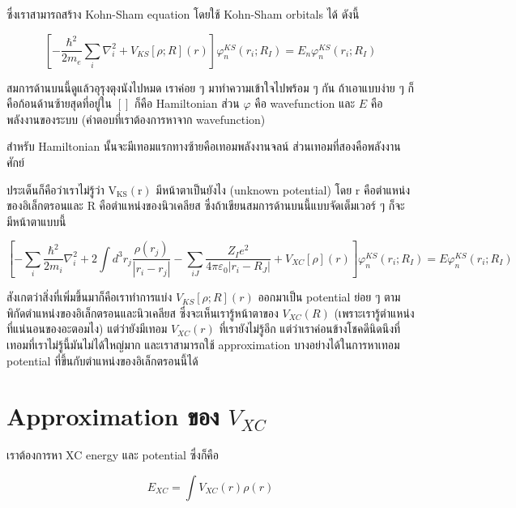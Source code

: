 \noindent ซึ่งเราสามารถสร้าง Kohn-Sham equation โดยใช้ Kohn-Sham orbitals ได้ ดังนี้

\begin{equation}
    \left[-\frac{\hbar^2}{2 m_e} \sum_i \nabla_i^2
        + V_{K S}[\rho ; R](r)\right]
    \varphi_n^{K S}\left(r_i ; R_I\right)
    = E_n \varphi_n^{K S}\left(r_i ; R_I\right)
\end{equation}

\noindent สมการด้านบนนี้ดูแล้วอุรุงตุงนังไปหมด เราค่อย ๆ มาทำความเข้าใจไปพร้อม ๆ กัน ถ้าเอาแบบง่าย ๆ
ก็คือก้อนด้านซ้ายสุดที่อยู่ใน $[ ]$ ก็คือ Hamiltonian ส่วน $\varphi$ คือ wavefunction และ $E$
คือพลังงานของระบบ (คำตอบที่เราต้องการหาจาก wavefunction)

สำหรับ Hamiltonian นั้นจะมีเทอมแรกทางซ้ายคือเทอมพลังงานจลน์ ส่วนเทอมที่สองคือพลังงานศักย์

ประเด็นก็คือว่าเราไม่รู้ว่า $\mathrm{V}_{\mathrm{KS}}(\mathrm{r})$ มีหน้าตาเป็นยังไง (unknown potential)
โดย $\mathrm{r}$ คือตำแหน่งของอิเล็กตรอนและ $\mathrm{R}$ คือตำแหน่งของนิวเคลียส
ซึ่งถ้าเขียนสมการด้านบนนี้แบบจัดเต็มเวอร์ ๆ ก็จะมีหน้าตาแบบนี้

\begin{equation}
    \left[-\sum_i \frac{\hbar^2}{2 m_i} \nabla_i^2+2 \int d^3 r_j
        \frac{\rho\left(r_j\right)}{\left|r_i-r_j\right|}
        -\sum_{i J} \frac{Z_I e^2}{4 \pi \varepsilon_0\left|r_i-R_J\right|}
        + V_{X C}[\rho](r)\right] \varphi_n^{K S}\left(r_i ; R_I\right)
    = E \varphi_n^{K S}\left(r_i ; R_I\right)
\end{equation}

สังเกตว่าสิ่งที่เพิ่มขึ้นมาก็คือเราทำการแบ่ง $V_{K S}[\rho ; R](r)$ ออกมาเป็น potential ย่อย ๆ
ตามพิกัดตำแหน่งของอิเล็กตรอนและนิวเคลียส ซึ่งจะเห็นเรารู้หน้าตาของ $V_{X C}(R)$ (เพราะเรารู้ตำแหน่งที่แน่นอนของอะตอมไง)
แต่ว่ายังมีเทอม $V_{X C}(r)$ ที่เรายังไม่รู้อีก แต่ว่าเราค่อนข้างโชคดีนิดนึงที่เทอมที่เราไม่รู้นี้มันไม่ได้ใหญ่มาก%
และเราสามารถใช้ approximation บางอย่างได้ในการหาเทอม potential ที่ขึ้นกับตำแหน่งของอิเล็กตรอนนี้ได้

\section{Approximation ของ $V_{X C}$}

เราต้องการหา XC energy และ potential ซึ่งก็คือ

\begin{equation}
    E_{XC} = \int V_{X C}(r) \rho(r)
\end{equation}

